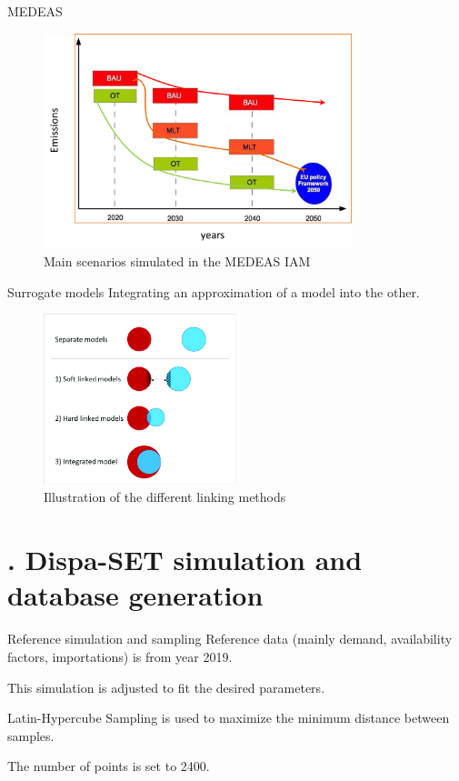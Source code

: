 \documentclass{beamer}
\newcommand{\mysection}[1]{\section{\thesection. #1}}
\begin{document}
    \begin{frame}{MEDEAS}
        \begin{figure}
            \centering
            \includegraphics[width=0.8\textwidth]{../resources/images/medeas-scenarios.png}
            \caption{Main scenarios simulated in the MEDEAS IAM}
        \end{figure}
    \end{frame}

    \begin{frame}{Surrogate models}
        Integrating an approximation of a model into the other.
        \begin{figure}
            \centering
            \includegraphics[width=0.5\textwidth]{../resources/images/hybrid_model_variants.png}
            \caption{Illustration of the different linking methods}
        \end{figure}        
    \end{frame}

    \mysection{Dispa-SET simulation and database generation}

    \begin{frame}{Reference simulation and sampling}
        Reference data (mainly demand, availability factors, importations) is from year 2019.

        This simulation is adjusted to fit the desired parameters.

        Latin-Hypercube Sampling is used to maximize the minimum distance between samples.

        The number of points is set to 2400.
    \end{frame}
\end{document}
